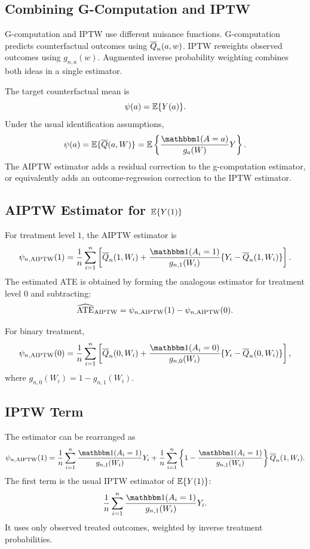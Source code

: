 \label{lec:7-2}

\subsection{Combining G-Computation and IPTW}

G-computation and IPTW use different nuisance functions. G-computation predicts
counterfactual outcomes using $\overline{Q}_n(a,w)$. IPTW reweights observed outcomes
using $g_{n,a}(w)$. Augmented inverse probability weighting combines both ideas in a
single estimator.

The target counterfactual mean is
\[
\psi(a)=\mathbb{E}\{Y(a)\}.
\]
Under the usual identification assumptions,
\[
\psi(a)=\E\{\Qbar(a,W)\}
=
\E\left\{\frac{\ind(A=a)}{g_a(W)}Y\right\}.
\]
The AIPTW estimator adds a residual correction to the g-computation estimator, or
equivalently adds an outcome-regression correction to the IPTW estimator.

\subsection{AIPTW Estimator for $\mathbb{E}\{Y(1)\}$}

For treatment level $1$, the AIPTW estimator is
\[
\psi_{n,\AIPTW}(1)
=
\frac{1}{n}\sum_{i=1}^n
\left[
\Qbar_n(1,W_i)
+
\frac{\ind(A_i=1)}{g_{n,1}(W_i)}
\{Y_i-\Qbar_n(1,W_i)\}
\right].
\]
The estimated ATE is obtained by forming the analogous estimator for treatment level
$0$ and subtracting:
\[
\widehat{\operatorname{ATE}}_{\operatorname{AIPTW}}
=
\psi_{n,\operatorname{AIPTW}}(1)-\psi_{n,\operatorname{AIPTW}}(0).
\]

\begin{estimationbox}
For binary treatment,
\[
\psi_{n,\AIPTW}(0)
=
\frac{1}{n}\sum_{i=1}^n
\left[
\Qbar_n(0,W_i)
+
\frac{\ind(A_i=0)}{g_{n,0}(W_i)}
\{Y_i-\Qbar_n(0,W_i)\}
\right],
\]
where $g_{n,0}(W_i)=1-g_{n,1}(W_i)$.
\end{estimationbox}

\subsection{IPTW Term}

The estimator can be rearranged as
\[
\psi_{n,\AIPTW}(1)
=
\frac{1}{n}\sum_{i=1}^n
\frac{\ind(A_i=1)}{g_{n,1}(W_i)}Y_i
+
\frac{1}{n}\sum_{i=1}^n
\left\{
1-\frac{\ind(A_i=1)}{g_{n,1}(W_i)}
\right\}
\Qbar_n(1,W_i).
\]
The first term is the usual IPTW estimator of $\mathbb{E}\{Y(1)\}$:
\[
\frac{1}{n}\sum_{i=1}^n
\frac{\ind(A_i=1)}{g_{n,1}(W_i)}Y_i.
\]
It uses only observed treated outcomes, weighted by inverse treatment probabilities.

